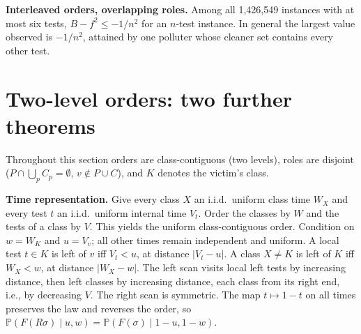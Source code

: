 \documentclass[11pt,a4paper]{article}
\theoremstyle{definition}\newtheorem{definition}[theorem]{Definition}
\theoremstyle{remark}\newtheorem{remark}[theorem]{Remark}
\newcommand{\Prb}{\mathbb P}
\theoremstyle{definition}\newtheorem{xexample}[xtheorem]{Example}\theoremstyle{plain}
\begin{document}
\textbf{Interleaved orders, overlapping roles.} Among all 1{,}426{,}549 instances with at most six tests, $B-f^2\le-1/n^2$ for an $n$-test instance. In general the largest value observed is $-1/n^2$, attained by one polluter whose cleaner set contains every other test.

\section{Two-level orders: two further theorems}\label{sec:twolevel2}
Throughout this section orders are class-contiguous (two levels), roles are disjoint ($P\cap\bigcup_pC_p=\emptyset$, $v\notin P\cup C$), and $K$ denotes the victim's class.

\textbf{Time representation.} Give every class $X$ an i.i.d.\ uniform class time $W_X$ and every test $t$ an i.i.d.\ uniform internal time $V_t$. Order the classes by $W$ and the tests of a class by $V$. This yields the uniform class-contiguous order. Condition on $w=W_K$ and $u=V_v$; all other times remain independent and uniform. A local test $t\in K$ is left of $v$ iff $V_t<u$, at distance $|V_t-u|$. A class $X\ne K$ is left of $K$ iff $W_X<w$, at distance $|W_X-w|$. The left scan visits local left tests by increasing distance, then left classes by increasing distance, each class from its right end, i.e., by decreasing $V$. The right scan is symmetric. The map $t\mapsto1-t$ on all times preserves the law and reverses the order, so $\Prb(F(R\sigma)\mid u,w)=\Prb(F(\sigma)\mid1-u,1-w)$.
\end{document}
